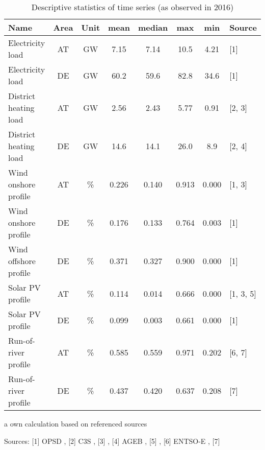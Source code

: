\documentclass[review, 3p, times, 12pt, authoryear]{elsarticle}
\begin{document}
    \begin{table*}[t]
        \centering
        \begin{threeparttable}
            \caption{Descriptive statistics of time series (as observed in 2016)}\label{tab:time-series}
            \begin{tabular}{l c c c c c c l}
                \toprule
                Name                           & Area & Unit & mean  & median & max   & min   & Source    \\
                \midrule
                Electricity load               & AT   & GW   & 7.15  & 7.14   & 10.5  & 4.21  & [1]       \\
                Electricity load               & DE   & GW   & 60.2  & 59.6   & 82.8  & 34.6  & [1]       \\
                District heating load\tnote{a} & AT   & GW   & 2.56  & 2.43   & 5.77  & 0.91  & [2, 3]    \\
                District heating load\tnote{a} & DE   & GW   & 14.6  & 14.1   & 26.0  & 8.9   & [2, 4]    \\
                \midrule
                Wind onshore profile           & AT   & \%   & 0.226 & 0.140  & 0.913 & 0.000 & [1, 3]    \\
                Wind onshore profile           & DE   & \%   & 0.176 & 0.133  & 0.764 & 0.003 & [1]       \\
                Wind offshore profile          & DE   & \%   & 0.371 & 0.327  & 0.900 & 0.000 & [1]       \\
                Solar PV profile\tnote{a}      & AT   & \%   & 0.114 & 0.014  & 0.666 & 0.000 & [1, 3, 5] \\
                Solar PV profile               & DE   & \%   & 0.099 & 0.003  & 0.661 & 0.000 & [1]       \\
                Run-of-river profile\tnote{a}  & AT   & \%   & 0.585 & 0.559  & 0.971 & 0.202 & [6, 7]    \\
                Run-of-river profile           & DE   & \%   & 0.437 & 0.420  & 0.637 & 0.208 & [7]       \\
                \bottomrule
            \end{tabular}
            \begin{tablenotes}
                \footnotesize
                \item[a] own calculation based on referenced sources
                \item Sources:
                [1] OPSD \citeyearpar{opsd2019},
                [2] C3S \citeyearpar{CCCS2017},
                [3] \cite{StatistikAustria2020},
                [4] AGEB \citeyearpar{AGEB2018},
                [5] \cite{Biermayr2019},
                [6] ENTSO-E \citeyearpar{ENTSOE2020b},
                [7] \cite{EControl2020}
            \end{tablenotes}
        \end{threeparttable}
    \end{table*}
\end{document}
